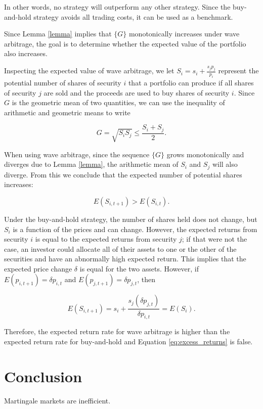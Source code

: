 \documentclass[10pt]{article}
\begin{document}
\begin{multicols}{2}
In other words, no strategy will outperform any other strategy. Since the
buy-and-hold strategy avoids all trading costs, it can be used as a benchmark.

Since Lemma \ref{lemma} implies that $\{G\}$ monotonically increases under wave
arbitrage, the goal is to determine whether the expected value of the portfolio
also increases.

Inspecting the expected value of wave arbitrage, we let
$S_i = s_i + \frac{s_j p_j}{p_i}$ represent the potential number of shares of
security $i$ that a portfolio can produce if all shares of security $j$ are sold
and the proceeds are used to buy shares of security $i$. Since $G$ is the
geometric mean of two quantities, we can use the inequality of arithmetic and
geometric means to write

\begin{equation}
  G = \sqrt{S_i S_j} \leq \frac{S_i + S_j}{2}.
\end{equation}

When using wave arbitrage, since the sequence $\{G\}$ grows monotonically and
diverges due to Lemma \ref{lemma}, the arithmetic mean of $S_i$ and $S_j$ will
also diverge. From this we conclude that the expected number of potential
shares increases:

\begin{equation}
  E(S_{i,t+1}) > E(S_{i,t}).
\end{equation}

Under the buy-and-hold strategy, the number of shares held does not change, but
$S_i$ is a function of the prices and can change. However, the expected returns
from security $i$ is equal to the expected returns from security $j$; if that
were not the case, an investor could allocate all of their assets to one or the
other of the securities and have an abnormally high expected return. This
implies that the expected price change $\delta$ is equal for the two assets.
However, if $E (p_{i,t+1}) = \delta p_{i,t}$ and $E (p_{j,t+1}) = \delta
p_{j,t}$, then

\begin{equation}
  E(S_{i,t+1}) = s_i + \frac{s_j (\delta p_{j,t})}{\delta p_{i,t}} = E (S_{i}).
\end{equation}

Therefore, the expected return rate for wave arbitrage is higher than the
expected return rate for buy-and-hold and Equation \ref{eq:excess_returns} is
false.

\section{Conclusion}
Martingale markets are inefficient.




\end{multicols}
\end{document}
